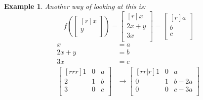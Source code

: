 \documentclass{report}
\newtheorem*{ex}{Example}
\begin{document}
\begin{ex}
Another way of looking at this is:
\[ f(\begin{bmatrix}[r]x\\y\\\end{bmatrix}) = \begin{bmatrix}[r]x\\2x+y\\3x\\\end{bmatrix} = \begin{bmatrix}[r]a\\b\\c\\\end{bmatrix} \]
\begin{align*}
x&=a\\ 2x+y&=b\\ 3x&=c\\
\begin{bmatrix}[rrr]1&0&a\\2&1&b\\3&0&c\\\end{bmatrix} &\rightarrow \begin{bmatrix}[rr|r]1&0&a\\0&1&b-2a\\0&0&c-3a\\\end{bmatrix}
\end{align*}
\end{ex}
\end{document}
